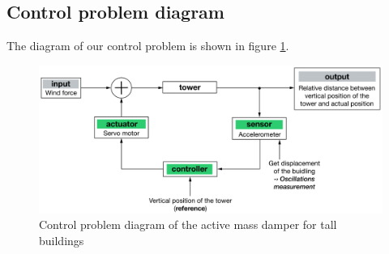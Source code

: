\subsection{Control problem diagram}
The diagram of our control problem is shown in figure \ref{fig:diagram}.
\begin{figure}[!ht]
    \centering
    \includegraphics[width=1\textwidth]{resources/pdf/control-problem-diagram.pdf}
    \caption{Control problem diagram of the active mass damper for tall buildings}
    \label{fig:diagram}
\end{figure}

